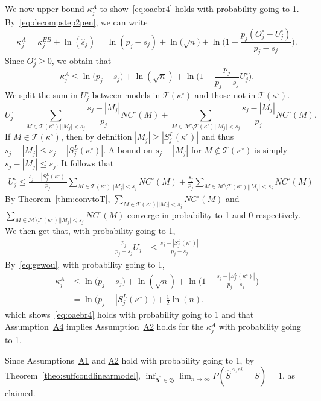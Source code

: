 \documentclass[
  12pt]{article}
\newcommand{\M}{\mathcal{M}}
\newcommand{\T}{\mathcal{T}}
\newcommand{\bbeta}{\boldsymbol{\beta}}
\newcommand{\bB}{\mathfrak{B}}
\begin{document}
We now upper bound $\kappa^{A}_j$ to show~\eqref{eq:oaebr4} holds with probability going to 1. By~\eqref{eq:decompstep2pen}, we can write
    $$\kappa_j^{A}=\kappa_j^{EB}+\ln(\widehat s_j)= \ln(p_j-s_j)+\ln\big(\sqrt{n}\big)+\ln\Big(1-\frac{p_j(O^{\circ}_j-U^{\circ}_j)}{p_j-s_j}\Big).$$
Since $O_j^{\circ} \geq 0$, we obtain that 
\begin{equation*}
    \kappa^{A}_j \leq \ln\big(p_j-s_j\big)+\ln(\sqrt{n})+\ln\bigg(1+\frac{p_j}{p_j-s_j}U^{\circ}_j\bigg).
\end{equation*}
We split the sum in $U^{\circ}_j$ between models in $\T(\kappa^{\circ})$ and those not in $\T(\kappa^{\circ})$. 
$$U_j^{\circ} = \sum_{M \in \T(\kappa^{\circ}) | |M_j| < s_j}\frac{s_j-|M_j|}{p_j}NC^{\circ}(M)+\sum_{M \in \M\setminus\T(\kappa^{\circ}) | |M_j| < s_j}\frac{s_j-|M_j|}{p_j}NC^{\circ}(M).
$$
If $M\in \T(\kappa^{\circ})$, then by definition $|M_j|\geq |S^{L}_j(\kappa^{\circ})|$ and thus $s_j-|M_j|\leq s_j-|S^{L}_j(\kappa^{\circ})|$. A bound on $s_j-|M_j|$ for $M\not\in \T(\kappa^{\circ})$ is simply $s_j-|M_j|\leq s_j$. It follows that
\begin{eqnarray*}
    U^{\circ}_j \leq \frac{s_j-|S^{L}_j(\kappa^{\circ})|}{p_j}\sum_{M \in \T(\kappa^{\circ}) | |M_j| < s_j}NC^{\circ}(M)+  \frac{s_j}{p_j}\sum_{M \in \M \setminus \T(\kappa^{\circ})| |M_j| < s_j}NC^{\circ}(M)
\end{eqnarray*}
By Theorem~\ref{thm:convtoT}, $\sum_{M \in  \T(\kappa^{\circ})| |M_j| < s_j}NC^{\circ}(M)$ and $\sum_{M \in \M \setminus \T(\kappa^{\circ})| |M_j| < s_j}NC^{\circ}(M)$ converge in probability to 1 and 0 respectively. We then get that, with probability going to 1,
\begin{align}
    \frac{p_j}{p_j-s_j}U^{\circ}_j &\leq \frac{s_j-|S^{L}_j(\kappa^{\circ})|}{p_j-s_j} \label{eq:gewou}
\end{align}
By~\eqref{eq:gewou}, with probability going to 1,
\begin{align}\label{eq:finalupperboundkappaj2}
    \kappa_j^A &\leq  \ln\big(p_j-s_j\big)+\ln(\sqrt{n})+\ln\bigg(1+\frac{s_j-|S^{L}_j(\kappa^{\circ})|}{p_j-s_j}\bigg)\nonumber\\
    &= \ln\big(p_j-|S^{L}_j(\kappa^{\circ})|\big)+\frac{1}{2}\ln(n).
\end{align}
which shows~\eqref{eq:oaebr4} holds with probability going to 1 and that
Assumption~\hyperlink{lab:A4}{A4} implies Assumption~\hyperlink{lab:A2}{A2} holds for the $\kappa^{A}_j$ with probability going to 1. 

Since Assumptions~\hyperlink{lab:A1}{A1} and \hyperlink{lab:A2}{A2} hold with probability going to 1, by Theorem~\ref{theo:suffcondlinearmodel}, $\inf_{\bbeta^*\in\bB}\lim_{n\to\infty}P(\hat{S}^{A,ei}= S)= 1$, as claimed.
\end{document}
